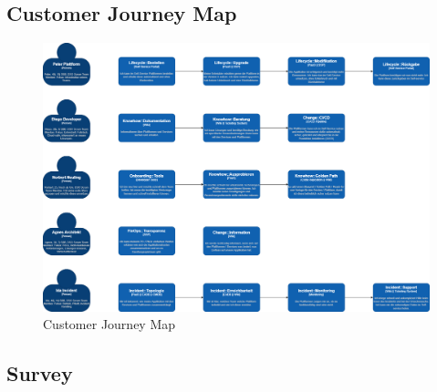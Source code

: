 \documentclass[a4paper,12pt]{article}
\begin{document}
    \subsection{Customer Journey Map}
    \label{subsec:cusjourmap}
    \begin{figure}
        \includegraphics[angle=270,origin=c,width=\linewidth]{customer-journey.png}
        \caption{Customer Journey Map}
        \label{fig:customerjourney}
    \end{figure}

    \subsection{Survey}
    \label{subsec:survey}
\end{document}
